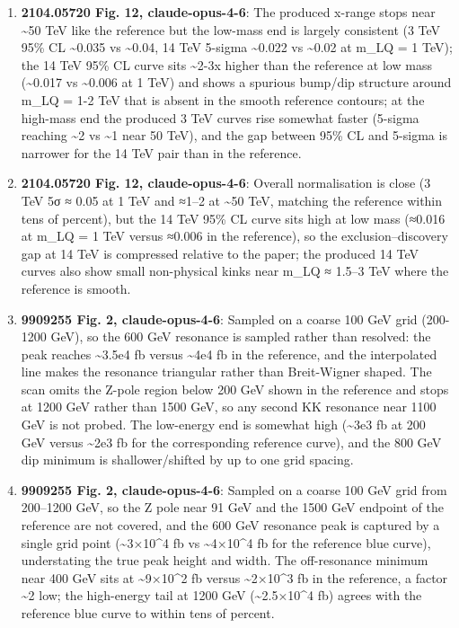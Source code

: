 \begin{enumerate}
\item \textbf{2104.05720 Fig. 12, claude-opus-4-6}: The produced x-range stops near \textasciitilde{}50 TeV like the reference but the low-mass end is largely consistent (3 TeV 95\% CL \textasciitilde{}0.035 vs \textasciitilde{}0.04, 14 TeV 5-sigma \textasciitilde{}0.022 vs \textasciitilde{}0.02 at m\_LQ = 1 TeV); the 14 TeV 95\% CL curve sits \textasciitilde{}2-3x higher than the reference at low mass (\textasciitilde{}0.017 vs \textasciitilde{}0.006 at 1 TeV) and shows a spurious bump/dip structure around m\_LQ = 1-2 TeV that is absent in the smooth reference contours; at the high-mass end the produced 3 TeV curves rise somewhat faster (5-sigma reaching \textasciitilde{}2 vs \textasciitilde{}1 near 50 TeV), and the gap between 95\% CL and 5-sigma is narrower for the 14 TeV pair than in the reference.
\item \textbf{2104.05720 Fig. 12, claude-opus-4-6}: Overall normalisation is close (3 TeV 5σ ≈ 0.05 at 1 TeV and ≈1–2 at \textasciitilde{}50 TeV, matching the reference within tens of percent), but the 14 TeV 95\% CL curve sits high at low mass (≈0.016 at m\_LQ = 1 TeV versus ≈0.006 in the reference), so the exclusion–discovery gap at 14 TeV is compressed relative to the paper; the produced 14 TeV curves also show small non-physical kinks near m\_LQ ≈ 1.5–3 TeV where the reference is smooth.
\item \textbf{9909255 Fig. 2, claude-opus-4-6}: Sampled on a coarse 100 GeV grid (200-1200 GeV), so the 600 GeV resonance is sampled rather than resolved: the peak reaches \textasciitilde{}3.5e4 fb versus \textasciitilde{}4e4 fb in the reference, and the interpolated line makes the resonance triangular rather than Breit-Wigner shaped. The scan omits the Z-pole region below 200 GeV shown in the reference and stops at 1200 GeV rather than 1500 GeV, so any second KK resonance near 1100 GeV is not probed. The low-energy end is somewhat high (\textasciitilde{}3e3 fb at 200 GeV versus \textasciitilde{}2e3 fb for the corresponding reference curve), and the 800 GeV dip minimum is shallower/shifted by up to one grid spacing.
\item \textbf{9909255 Fig. 2, claude-opus-4-6}: Sampled on a coarse 100 GeV grid from 200–1200 GeV, so the Z pole near 91 GeV and the 1500 GeV endpoint of the reference are not covered, and the 600 GeV resonance peak is captured by a single grid point (\textasciitilde{}3×10\textasciicircum{}4 fb vs \textasciitilde{}4×10\textasciicircum{}4 fb for the reference blue curve), understating the true peak height and width. The off-resonance minimum near 400 GeV sits at \textasciitilde{}9×10\textasciicircum{}2 fb versus \textasciitilde{}2×10\textasciicircum{}3 fb in the reference, a factor \textasciitilde{}2 low; the high-energy tail at 1200 GeV (\textasciitilde{}2.5×10\textasciicircum{}4 fb) agrees with the reference blue curve to within tens of percent.

\end{enumerate}
